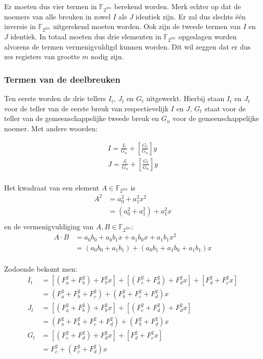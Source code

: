 Er moeten dus vier termen in $\mathbb{F}_{2^{2m}}$ berekend worden. Merk echter op dat de noemers van alle breuken in zowel $I$ als $J$ identiek zijn. Er zal dus slechts \'e\'en inversie in $\mathbb{F}_{2^{2m}}$ uitgerekend moeten worden. Ook zijn de tweede termen van $I$ en $J$ identiek. In totaal moeten dus drie elementen in $\mathbb{F}_{2^{2m}}$ opgeslagen worden alvorens de termen  vermenigvuldigd kunnen worden. Dit wil zeggen dat er dus zes registers van grootte $m$ nodig zijn.

\subsubsection{Termen van de deelbreuken}

Ten eerste worden de drie tellers $I_t$, $J_t$ en $G_t$ uitgewerkt. Hierbij staan $I_t$ en $J_t$ voor de teller van de eerste breuk van respectievelijk $I$ en $J$, $G_t$ staat voor de teller van de gemeenschappelijke tweede breuk en $G_n$ voor de gemeenschappelijke noemer. Met andere woorden:

\[\begin{aligned}
I = \frac{I_t}{G_n} + \left[ \frac{G_t}{G_n} \right] y\\
J = \frac{J_t}{G_n} + \left[ \frac{G_t}{G_n} \right] y\\
\end{aligned}\]

Het kwadraat van een element $A \in \mathbb{F}_{2^{2m}}$ is
\[\begin{aligned}
A^2	&= a_0^2 + a_1^2 x^2\\
		&= (a_0^2 + a_1^2) + a_1^2 x\\
\end{aligned}\]
en de vermenigvuldiging van $A, B \in \mathbb{F}_{2^{2m}}$:
\[\begin{aligned}
A \cdot B	&= a_0 b_0 + a_0 b_1 x + a_1 b_0 x + a_1 b_1 x^2\\
				&= (a_0 b_0 + a_1 b_1) + (a_0 b_1 + a_1 b_0 + a_1 b_1)x\\
\end{aligned}\]

Zodoende bekomt men:
\[\begin{aligned}
I_t	&= [(F_a^2 + F_b^2) + F_b^2 x] + [(F_c^2 + F_d^2) + F_d^2x] + [F_d^2 + F_c^2x]\\
		&= (F_a^2 + F_b^2 + F_c^2) + (F_b^2 + F_c^2 + F_d^2)x\\
J_t	&= [(F_a^2 + F_b^2) + F_b^2 x] + [(F_c^2 + F_d^2) + F_d^2x]\\
		&= (F_a^2 + F_b^2 + F_c^2 + F_d^2) + (F_b^2 + F_d^2)x\\
G_t	&= [(F_c^2 + F_d^2) + F_d^2x] + [F_d^2 + F_c^2x]\\
		&= F_c^2 + (F_c^2 + F_d^2)x\\
\end{aligned}\]

